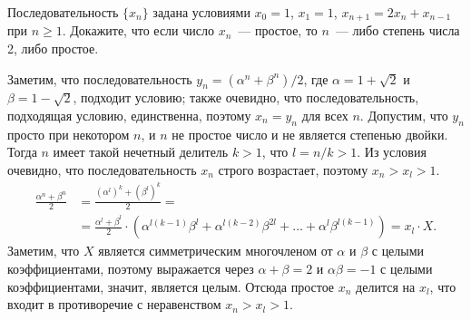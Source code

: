 Последовательность $\{ x_n \}$ задана условиями
$x_0 = 1$, $x_1 = 1$, $x_{n + 1} = 2 x_{n} + x_{n - 1}$ при $n \geq 1$.
Докажите, что если число $x_n$~--- простое, то $n$~--- либо степень числа 2,
либо простое.

\solution
Заметим, что последовательность
$y_n = (\alpha^n + \beta^n)/2$,
где $\alpha = 1 + \sqrt{2}$ и $\beta = 1 - \sqrt{2}$,
подходит условию;
также очевидно, что последовательность, подходящая условию, единственна,
поэтому $x_n = y_n$ для всех $n$.
Допустим, что $y_n$ просто при некотором $n$, и $n$ не простое число и не
является степенью двойки.
Тогда $n$ имеет такой нечетный делитель $k > 1$, что $l = n / k > 1$.
Из условия очевидно, что последовательность $x_n$ строго возрастает, поэтому
$x_n > x_l > 1$.
\begin{align*}
    \frac{\alpha^n + \beta^n}{2}
&{}=
    \frac{(\alpha^l)^k + (\beta^l)^k}{2}
=\\&{}=
    \frac{\alpha^l + \beta^l}{2}
    \cdot
    \left(
        \alpha^{l (k - 1)} \beta^l
        +
        \alpha^{l (k - 2)} \beta^{2 l}
        + \ldots +
        \alpha^l \beta^{l (k - 1)}
    \right)
=
    x_l \cdot X
.\end{align*}
Заметим, что $X$ является симметрическим многочленом от $\alpha$ и $\beta$ с
целыми коэффициентами,
поэтому выражается через $\alpha + \beta = 2$ и $\alpha \beta = -1$
с целыми коэффициентами, значит, является целым.
Отсюда простое $x_n$ делится на $x_l$, что входит в противоречие с
неравенством $x_n > x_l > 1$.

